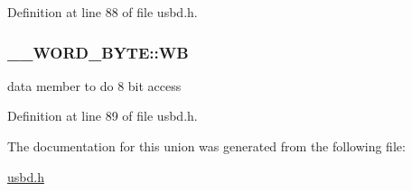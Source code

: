 Definition at line 88 of file usbd.\+h.

\subsubsection[{\texorpdfstring{WB}{WB}}]{ \+\_\+\+\_\+\+W\+O\+R\+D\+\_\+\+B\+Y\+T\+E\+::\+WB}\hypertarget{union____WORD__BYTE_a3ea700711d4333320b15562bbf2ab59c}{}\label{union____WORD__BYTE_a3ea700711d4333320b15562bbf2ab59c}
data member to do 8 bit access 

Definition at line 89 of file usbd.\+h.



The documentation for this union was generated from the following file\+:\begin{DoxyCompactItemize}
\item 
\hyperlink{usbd_8h}{usbd.\+h}\end{DoxyCompactItemize}
